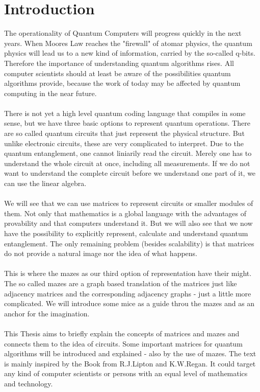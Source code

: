 \documentclass[oneside]{thesisclass}
\begin{document}

\frontmatter
{}



\tableofcontents


\mainmatter
{}
\chapter{Introduction}
\nocite{*}
The operationality of Quantum Computers will progress quickly in the next years. 
When Moores Law reaches the "firewall" of atomar physics, the quantum physics will lead us to a new kind of information, carried by the so-called q-bits. 
Therefore the importance of understanding quantum algorithms rises. 
All computer scientists should at least be aware of the possibilities quantum algorithms provide, because the work of today may be affected by quantum computing in the near future. \\
\\There is not yet a high level quantum coding language that compiles in some sense, but we have three basic options to represent quantum operations.
There are so called quantum circuits that just represent the physical structure. 
But unlike electronic circuits, these are very complicated to interpret.
Due to the quantum entanglement, one cannot liniarily read the circuit. 
Merely one has to understand the whole circuit at once, including all measurements. 
If we do not want to understand the complete circuit before we understand one part of it, we can use the linear algebra. \\
\\We will see that we can use matrices to represent circuits or smaller modules of them. 
Not only that mathematics is a global language with the advantages of provability and that computers understand it.
But we will also see that we now have the possibility to explicitly represent, calculate and understand quantum entanglement.
The only remaining problem (besides scalability) is that matrices do not provide a natural image nor the idea of what happens.\\
\\This is where the mazes as our third option of representation have their might.
The so called mazes are a graph based translation of the matrices just like adjacency matrices and the corresponding adjacency graphs - just a little more complicated.
We will introduce some mice as a guide throu the mazes and as an anchor for the imagination.\\
\\This Thesis aims to briefly explain the concepts of matrices and mazes and connects them to the idea of circuits. 
Some important matrices for quantum algorithms will be introduced and explained - also by the use of mazes.
The text is mainly inspired by the Book from R.J.Lipton and K.W.Regan.
It could target any kind of computer scientists or persons with an equal level of mathematics and technology.
\end{document}
